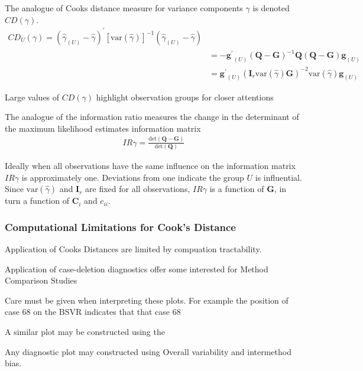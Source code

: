 \documentclass[12pt, a4paper]{report}
\theoremstyle{plain}
\theoremstyle{definition}
\theoremstyle{remark}
\begin{document}
	The analogue of Cooks distance measure for variance components $\gamma$ is denoted $CD(\gamma)$.
	\begin{eqnarray*}
		CD_{U}(\gamma) = (\hat{\gamma}_{(U)} - \hat{\gamma})^{\prime}[\mbox{var}(\hat{\gamma})]^{-1}(\hat{\gamma}_{(U)} - \hat{\gamma})\\
		&= -\boldsymbol{g^{\prime}}_{(U)} (\boldsymbol{Q}-\boldsymbol{G})^{-1}\boldsymbol{Q}(\boldsymbol{Q}-\boldsymbol{G})\boldsymbol{g}_{(U)} \\
		&= \boldsymbol{g^{\prime}}_{(U)} (\boldsymbol{I}_{r}  \mbox{var}(\hat{\gamma})\boldsymbol{G})^{-2}\mbox{var}(\hat{\gamma})\boldsymbol{g}_{(U)}
	\end{eqnarray*}
	
	Large values of $CD(\gamma)$ highlight observation groups for closer attentions
	
	The analogue of the information ratio measures the change in the determinant of the maximum likelihood estimates information matrix
	\begin{eqnarray*}
		IR{\gamma}  = \frac{\mbox{det}(\boldsymbol{Q} - \boldsymbol{G})}{\mbox{det}(\boldsymbol{Q})}
	\end{eqnarray*}
	
	Ideally when all observations have the same influence on the information matrix $IR{\gamma}$ is approximately one.
	Deviations from one indicate the group $U$ is influential. Since $\mbox{var}(\hat{\gamma})$ and $\boldsymbol{I}_{r}$ are fixed for all observations, $IR{\gamma}$ is a function of $\boldsymbol{G}$, in turn a function of $\boldsymbol{C}_{i}$ and $c_{ii}$.


	\subsubsection{Computational Limitations for Cook's Distance}
	Application of Cooks Distances are limited by compuation tractability.
	
	
	Application of case-deletion diagnostics offer some interested for Method Comparison Studies
	
	
	Care must be given when interpreting these plots. For example the position of case 68 on the BSVR indicates that that
	case 68 
	
	A similar plot may be constructed using the
	
	Any diagnostic plot may constructed using Overall variability and intermethod bias.
	

	
\end{document}
